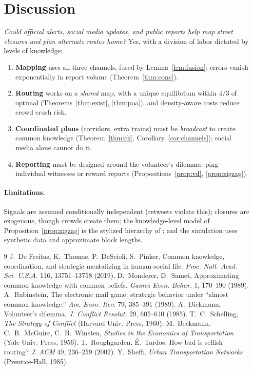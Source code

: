 \documentclass[11pt]{article}
\theoremstyle{definition}
\theoremstyle{remark}
\newcommand{\1}{\mathbf{1}}
\begin{document}
\section{Discussion}

\emph{Could official alerts, social media updates, and public reports help
map street closures and plan alternate routes home?} Yes, with a division
of labor dictated by levels of knowledge:
\begin{enumerate}
\item \textbf{Mapping} uses all three channels, fused by
Lemma~\ref{lem:fusion}; errors vanish exponentially in report volume
(Theorem~\ref{thm:conc}).
\item \textbf{Routing} works on a \emph{shared} map, with a unique
equilibrium within $4/3$ of optimal (Theorems~\ref{thm:exist},
\ref{thm:poa}), and density-aware costs reduce crowd crush risk.
\item \textbf{Coordinated plans} (corridors, extra trains) must be
\emph{broadcast} to create common knowledge (Theorem~\ref{thm:ck},
Corollary~\ref{cor:channels}); social media alone cannot do it.
\item \textbf{Reporting} must be designed around the volunteer's dilemma:
ping individual witnesses or reward reports
(Propositions~\ref{prop:vd}, \ref{prop:zigzag}).
\end{enumerate}

\paragraph{Limitations.} Signals are assumed conditionally independent
(retweets violate this); closures are exogenous, though crowds create
them; the knowledge-level model of Proposition~\ref{prop:zigzag} is the
stylized hierarchy of \cite{dfp}; and the simulation uses synthetic data
and approximate block lengths.

\begin{thebibliography}{9}
 J.~De Freitas, K.~Thomas, P.~DeScioli, S.~Pinker, Common
knowledge, coordination, and strategic mentalizing in human social life.
\emph{Proc. Natl. Acad. Sci. U.S.A.} 116, 13751--13758 (2019).
 D.~Monderer, D.~Samet, Approximating common knowledge with
common beliefs. \emph{Games Econ. Behav.} 1, 170--190 (1989).
 A.~Rubinstein, The electronic mail game: strategic behavior
under ``almost common knowledge.'' \emph{Am. Econ. Rev.} 79, 385--391 (1989).
 A.~Diekmann, Volunteer's dilemma. \emph{J. Conflict
Resolut.} 29, 605--610 (1985).
 T.~C.~Schelling, \emph{The Strategy of Conflict}
(Harvard Univ. Press, 1960).
 M.~Beckmann, C.~B.~McGuire, C.~B.~Winsten, \emph{Studies in
the Economics of Transportation} (Yale Univ. Press, 1956).
 T.~Roughgarden, \'E.~Tardos, How bad is selfish routing?
\emph{J. ACM} 49, 236--259 (2002).
 Y.~Sheffi, \emph{Urban Transportation Networks}
(Prentice-Hall, 1985).
\end{thebibliography}
\end{document}
